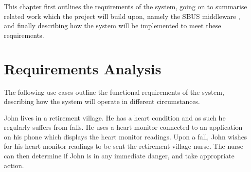 \documentclass[12pt,twoside,notitlepage]{report}
\begin{document}
This chapter first outlines the requirements of the system, going on to summarise related work which the project will build upon, namely the SBUS middleware \cite{ingram2009reconfigurable}, and finally describing how the system will be implemented to meet these requirements.


\section{Requirements Analysis}

The following use cases outline the functional requirements of the system, describing how the system will operate in different circumstances.

John lives in a retirement village. He has a heart condition and as such he regularly suffers from falls. He uses a heart monitor connected to an application on his phone which displays the heart monitor readings. Upon a fall, John wishes for his heart monitor readings to be sent the retirement village nurse. The nurse can then determine if John is in any immediate danger, and take appropriate action.
\end{document}
